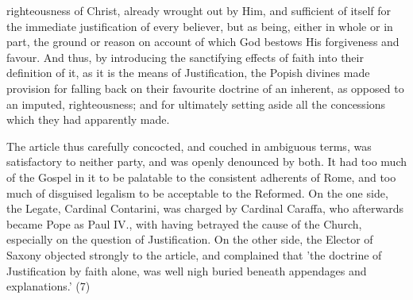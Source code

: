 \documentclass[
]{book}
\begin{document}
righteousness of Christ, already wrought out by Him, and sufficient of itself for the immediate justification of every believer, but as being, either in whole or in part, the ground or reason on account of which God bestows His forgiveness and favour. And thus, by introducing the sanctifying effects of faith into their definition of it, as it is the means of Justification, the Popish divines made provision for falling back on their favourite doctrine of an inherent, as opposed to an imputed, righteousness; and for ultimately setting aside all the concessions which they had apparently made.

The article thus carefully concocted, and couched in ambiguous terms, was satisfactory to neither party, and was openly denounced by both. It had too much of the Gospel in it to be palatable to the consistent adherents of Rome, and too much of disguised legalism to be acceptable to the Reformed. On the one side, the Legate, Cardinal Contarini, was charged by Cardinal Caraffa, who afterwards became Pope as Paul IV., with having betrayed the cause of the Church, especially on the question of Justification. On the other side, the Elector of Saxony objected strongly to the article, and complained that 'the doctrine of Justification by faith alone, was well nigh buried beneath appendages and explanations.' (7)
\end{document}
